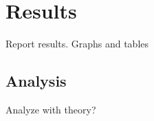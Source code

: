 \section{Results}
\label{sec:results}

Report results. Graphs and tables

\subsection{Analysis}
\label{subsec:analysis}

Analyze with theory?